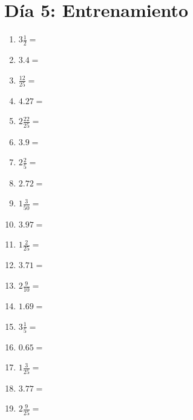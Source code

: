 \documentclass[12pt]{article}
\begin{document}
\section*{Día 5: Entrenamiento}
\begin{enumerate}
\item \large $ 3 \frac{1}{2} = $ \vspace{1.5cm}
\item \large $ 3.4 = $ \vspace{1.5cm}
\item \large $ \frac{12}{25} = $ \vspace{1.5cm}
\item \large $ 4.27 = $ \vspace{1.5cm}
\item \large $ 2 \frac{22}{25} = $ \vspace{1.5cm}
\item \large $ 3.9 = $ \vspace{1.5cm}
\item \large $ 2 \frac{2}{5} = $ \vspace{1.5cm}
\item \large $ 2.72 = $ \vspace{1.5cm}
\item \large $ 1 \frac{3}{50} = $ \vspace{1.5cm}
\item \large $ 3.97 = $ \vspace{1.5cm}
\newpage
\item \large $ 1 \frac{2}{25} = $ \vspace{1.5cm}
\item \large $ 3.71 = $ \vspace{1.5cm}
\item \large $ 2 \frac{9}{10} = $ \vspace{1.5cm}
\item \large $ 1.69 = $ \vspace{1.5cm}
\item \large $ 3 \frac{1}{5} = $ \vspace{1.5cm}
\item \large $ 0.65 = $ \vspace{1.5cm}
\item \large $ 1 \frac{3}{25} = $ \vspace{1.5cm}
\item \large $ 3.77 = $ \vspace{1.5cm}
\item \large $ 2 \frac{9}{25} = $ \vspace{1.5cm}

\end{enumerate}
\end{document}
